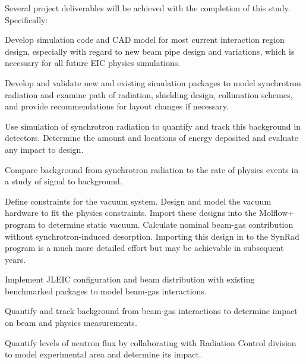 Several project deliverables will be achieved with the completion of this study.  Specifically:
\begin{itemize}[label=\textbullet]
	
		\litem{} Develop simulation code and CAD model for most current interaction region design, especially with regard to new beam pipe design and variations, which is necessary for all future EIC physics simulations. 
	
		\litem{}Develop and validate new and existing simulation packages to model synchrotron radiation and examine path of radiation, shielding design, collimation schemes, and provide recommendations for layout changes if necessary. 
		
		\litem{} Use simulation of synchrotron radiation to quantify and track this background in detectors.  Determine the amount and locations of energy deposited and evaluate any impact to  design.
		
		\litem{} Compare background from synchrotron radiation to the rate of physics events in a study of signal to background. 
		
		\litem{} Define constraints for the vacuum system.  Design and model the vacuum hardware to fit the physics constraints.  Import these designs into the Molflow+ program to determine static vacuum.  Calculate nominal beam-gas contribution without synchrotron-induced desorption.  Importing this design in to the SynRad program is a much more detailed effort but may be achievable in subsequent years.
		
		
		\litem{} Implement JLEIC configuration and beam distribution with existing benchmarked packages to model beam-gas interactions.
		
		\litem{} Quantify and track background from beam-gas interactions to determine impact on beam and physics measurements.
		
		\litem{} Quantify levels of neutron flux by collaborating with Radiation Control division to model experimental area and determine its impact. 
		

\end{itemize}

